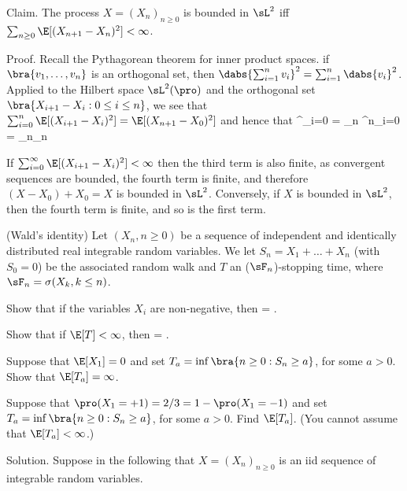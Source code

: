 Claim. The process $X = (X_n)_{n\geq 0}$ is bounded in $\sL^2$ iff $\sum_{n\geq 0}\E[(X_{n+1}-X_n)^2] < \infty$.

Proof. Recall the Pythagorean theorem for inner product spaces. if $\bra{v_1, \dots ,v_n}$ is an orthogonal set, then $\dabs{\sum^n_{i =1} v_i}^2 = \sum^n_{i=1} \dabs{v_i}^2$. Applied to the Hilbert space $\sL^2(\pro)$ and the orthogonal set $\bra{X_{i+1}-X_i : 0 \leq  i \leq  n}$, we see that $\sum^n_{i=0} \E[(X_{i+1}-X_i)^2] = \E[(X_{n+1}-X_0)^2]$ and hence that
\be
\sum^\infty_{i=0} \E[(X_{i+1}-X_i)^2] = \lim_{n\to \infty} \sum^n_{i=0} \E[(X_{i+1}-X_i)^2] = \lim_{n\to \infty}\E[(X_n-X_0)^2] \leq \sup_{n} \E[(X_n-X_0)^2]
\ee

If $\sum^\infty_{i=0} \E[(X_{i+1} - X_i)^2] < \infty$ then the third term is also finite, as convergent sequences are bounded, the fourth term is finite, and therefore $(X -X_0)+X_0 = X$ is bounded in $\sL^2$. Conversely, if $X$ is bounded in $\sL^2$, then the fourth term is finite, and so is the first term.

\vspace{2mm}

\qcutline


\item (Wald's identity) Let $(X_n, n \geq  0)$ be a sequence of independent and identically distributed real integrable random variables. We let $S_n = X_1 +\dots +X_n$ (with $S_0 = 0$) be the associated random walk and $T$ an ($\sF_n$)-stopping time, where $\sF_n = \sigma(X_k, k \leq n)$.
\ben
\item [(i)] Show that if the variables $X_i$ are non-negative, then
\be
\E[S_T ] = \E[T]\E[X_1].
\ee
\item [(ii)] Show that if $\E[T] < \infty$, then
\be
\E[S_T ] = \E[T]\E[X_1].
\ee

\item [(iii)] Suppose that $\E[X_1] = 0$ and set $T_a = \inf\bra{n \geq  0 : S_n \geq  a}$, for some $a > 0$. Show that $\E[T_a] = \infty$.
\item [(iv)] Suppose that $\pro(X_1 = +1) = 2/3 = 1 - \pro(X_1 = -1)$ and set $T_a = \inf\bra{n \geq  0 : S_n \geq  a}$, for some $a > 0$. Find $\E[T_a]$. (You cannot assume that $\E[T_a] < \infty$.)
\een

\scutline

Solution. Suppose in the following that $X =(X_n)_{n\geq 0}$ is an iid sequence of integrable random variables.

